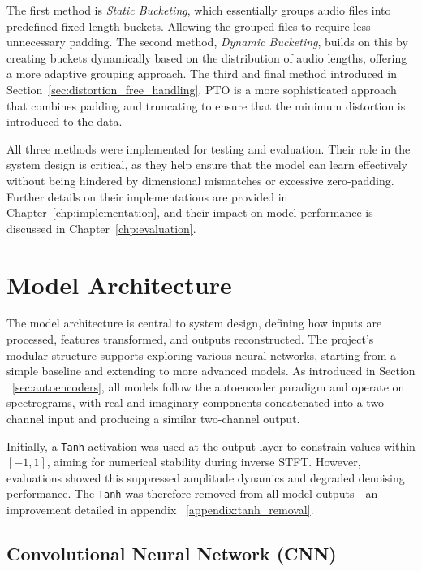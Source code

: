 The first method is \textit{Static Bucketing}, which essentially groups audio files into predefined fixed-length buckets. Allowing the grouped files to require less unnecessary padding. The second method, \textit{Dynamic Bucketing}, builds on this by creating buckets dynamically based on the distribution of audio lengths, offering a more adaptive grouping approach. The third and final method introduced in Section~\ref{sec:distortion_free_handling}. PTO is a more sophisticated approach that combines padding and truncating to ensure that the minimum distortion is introduced to the data.

All three methods were implemented for testing and evaluation. Their role in the system design is critical, as they help ensure that the model can learn effectively without being hindered by dimensional mismatches or excessive zero-padding. Further details on their implementations are provided in Chapter~\ref{chp:implementation}, and their impact on model performance is discussed in Chapter~\ref{chp:evaluation}.

\section{Model Architecture}
\label{sec:model_architecture}

The model architecture is central to system design, defining how inputs are processed, features transformed, and outputs reconstructed. The project’s modular structure supports exploring various neural networks, starting from a simple baseline and extending to more advanced models. As introduced in Section ~\ref{sec:autoencoders}, all models follow the autoencoder paradigm and operate on spectrograms, with real and imaginary components concatenated into a two-channel input and producing a similar two-channel output.

Initially, a \texttt{Tanh} activation was used at the output layer to constrain values within $[-1, 1]$, aiming for numerical stability during inverse STFT. However, evaluations showed this suppressed amplitude dynamics and degraded denoising performance. The \texttt{Tanh} was therefore removed from all model outputs—an improvement detailed in appendix ~\ref{appendix:tanh_removal}.

\subsection{Convolutional Neural Network (CNN)}
\label{sec:cnn}

